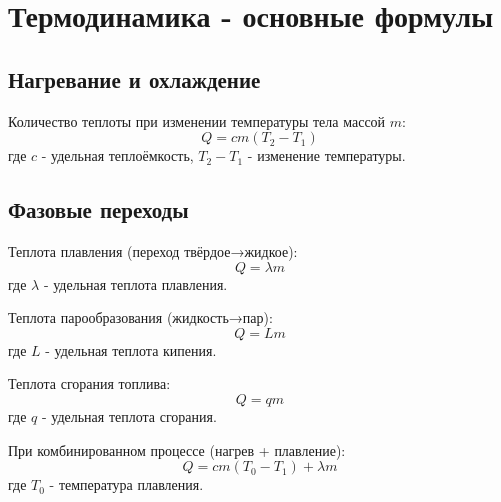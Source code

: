 \documentclass{article}
\begin{document}
\section*{Термодинамика - основные формулы}

\subsection*{Нагревание и охлаждение}
Количество теплоты при изменении температуры тела массой $m$:
\[Q = cm(T_2 - T_1)\]
где $c$ - удельная теплоёмкость, $T_2-T_1$ - изменение температуры.

\subsection*{Фазовые переходы}
Теплота плавления (переход твёрдое→жидкое):
\[Q = \lambda m\]
где $\lambda$ - удельная теплота плавления.

Теплота парообразования (жидкость→пар):
\[Q = Lm\]
где $L$ - удельная теплота кипения.

Теплота сгорания топлива:
\[Q = qm\]
где $q$ - удельная теплота сгорания.

При комбинированном процессе (нагрев + плавление):
\[Q = cm(T_0 - T_1) + \lambda m\]
где $T_0$ - температура плавления.
\end{document}
